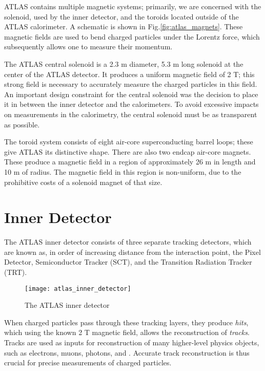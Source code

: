 ATLAS contains multiple magnetic systems; primarily, we are concerned with the solenoid, used by the inner detector, and the toroids located outside of the ATLAS calorimeter.
A schematic is shown in Fig.\ref{fig:atlas_magnets}.
These magnetic fields are used to bend charged particles under the Lorentz force, which subsequently allows one to measure their momentum.

The ATLAS central solenoid is a 2.3 m diameter, 5.3 m long solenoid at the center of the ATLAS detector.
It produces a uniform magnetic field of 2 T; this strong field is necessary to accurately measure the charged particles in this field.
An important design constraint for the central solenoid was the decision to place it in between the inner detector and the calorimeters.
To avoid excessive impacts on measurements in the calorimetry, the central solenoid must be as transparent as possible\footnotemark.

The toroid system consists of eight air-core superconducting barrel loops; these give ATLAS its distinctive shape.
There are also two endcap air-core magnets.
These produce a magnetic field in a region of approximately 26 m in length and 10 m of radius.
The magnetic field in this region is non-uniform, due to the prohibitive costs of a solenoid magnet of that size.

\section{Inner Detector}

The ATLAS inner detector consists of three separate tracking detectors, which are known as, in order of increasing distance from the interaction point, the Pixel Detector, Semiconductor Tracker (SCT), and the Transition Radiation Tracker (TRT).
\begin{figure}
\caption{The ATLAS inner detector} \label{fig:atlas_inner_detector}
\texttt{[image: atlas\_inner\_detector]}
\end{figure}
When charged particles pass through these tracking layers, they produce \textit{hits}, which using the known 2 T magnetic field, allows the reconstruction of \textit{tracks}.
Tracks are used as inputs for reconstruction of many higher-level physics objects, such as electrons, muons, photons, and \met.
Accurate track reconstruction is thus crucial for precise measurements of charged particles.

